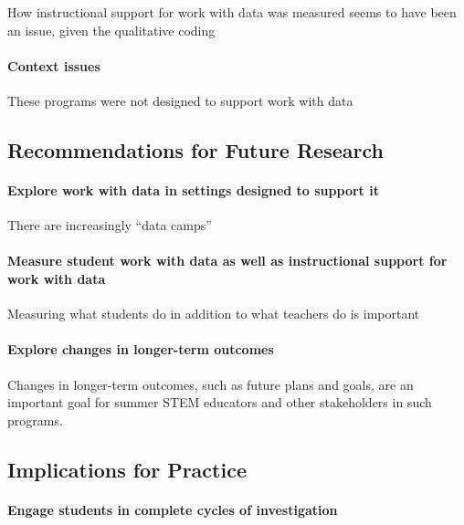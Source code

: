 \documentclass[]{msu-thesis}
\let\oldparagraph\paragraph
\renewcommand{\paragraph}[1]{\oldparagraph{#1}\mbox{}}
\theoremstyle{definition}
\theoremstyle{definition}
\theoremstyle{definition}
\theoremstyle{remark}
\begin{document}
How instructional support for work with data was measured seems to have
been an issue, given the qualitative coding

\paragraph{Context issues}\label{context-issues}

These programs were not designed to support work with data

\subsection{Recommendations for Future
Research}\label{recommendations-for-future-research}

\paragraph{Explore work with data in settings designed to support
it}\label{explore-work-with-data-in-settings-designed-to-support-it}

There are increasingly ``data camps''

\paragraph{Measure student work with data as well as instructional
support for work with
data}\label{measure-student-work-with-data-as-well-as-instructional-support-for-work-with-data}

Measuring what students do in addition to what teachers do is important

\paragraph{Explore changes in longer-term
outcomes}\label{explore-changes-in-longer-term-outcomes}

Changes in longer-term outcomes, such as future plans and goals, are an
important goal for summer STEM educators and other stakeholders in such
programs.

\subsection{Implications for Practice}\label{implications-for-practice}

\paragraph{Engage students in complete cycles of
investigation}\label{engage-students-in-complete-cycles-of-investigation}
\end{document}
